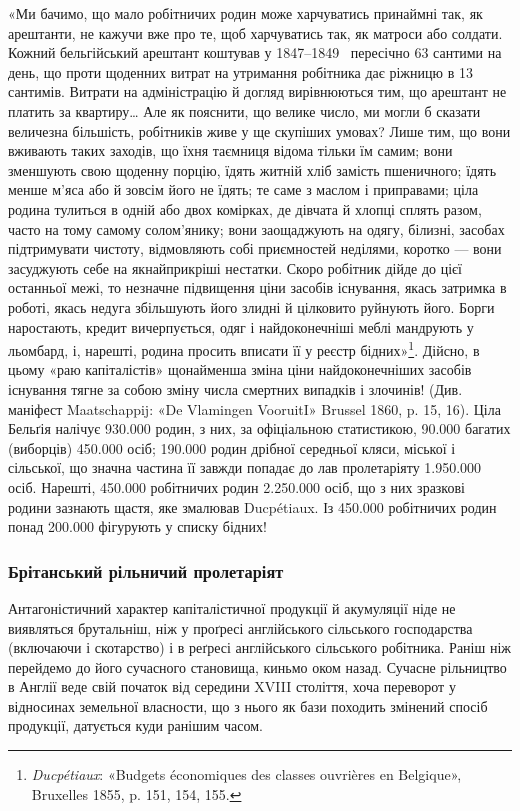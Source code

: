 
\noindent{}«Ми бачимо, що мало робітничих родин може харчуватись
принаймні так, як арештанти, не кажучи вже про те, щоб харчуватись
так, як матроси або солдати. Кожний бельгійський арештант
коштував у 1847--1849~ пересічно 63 сантими на день,
що проти щоденних витрат на утримання робітника дає ріжницю
в 13 сантимів. Витрати на адміністрацію й догляд вирівнюються
тим, що арештант не платить за квартиру\dots{} Але як пояснити, що
велике число, ми могли б сказати величезна більшість, робітників
живе у ще скупіших умовах? Лише тим, що вони вживають
таких заходів, що їхня таємниця відома тільки їм самим; вони
зменшують свою щоденну порцію, їдять житній хліб замість пшеничного;
їдять менше м’яса або й зовсім його не їдять; те саме
з маслом і приправами; ціла родина тулиться в одній або двох
комірках, де дівчата й хлопці сплять разом, часто на тому самому
солом’янику; вони заощаджують на одягу, білизні, засобах підтримувати
чистоту, відмовляють собі приємностей неділями,
коротко — вони засуджують себе на якнайприкріші нестатки.
Скоро робітник дійде до цієї останньої межі, то незначне підвищення
ціни засобів існування, якась затримка в роботі, якась
недуга збільшують його злидні й цілковито руйнують його. Борги
наростають, кредит вичерпується, одяг і найдоконечніші меблі
мандрують у льомбард, і, нарешті, родина просить вписати її
у реєстр бідних»\footnote{
\emph{Ducpétiaux}: «Budgets économiques des classes ouvrières en Belgique»,
Bruxelles 1855, p. 151, 154, 155.
}. Дійсно, в цьому «раю капіталістів» щонайменша
зміна ціни найдоконечніших засобів існування тягне
за собою зміну числа смертних випадків і злочинів! (Див. маніфест
Maatschappij: «De Vlamingen VooruitI» Brussel 1860,
p. 15, 16). Ціла Бельґія налічує \num{930.000} родин, з них, за офіціальною
статистикою, \num{90.000} багатих (виборців) \deq{} \num{450.000} осіб; \num{190.000}
родин дрібної середньої кляси, міської і сільської, що значна
частина її завжди попадає до лав пролетаріяту \deq{} \num{1.950.000} осіб.
Нарешті, \num{450.000} робітничих родин \deq{} \num{2.250.000} осіб, що з них
зразкові родини зазнають щастя, яке змалював Ducpétiaux. Із \num{450.000} робітничих
родин понад \num{200.000} фігурують у списку бідних!

\subsubsection{Брітанський рільничий пролетаріят}

Антагоністичний характер капіталістичної продукції й акумуляції
ніде не виявляться брутальніш, ніж у проґресі англійського
сільського господарства (включаючи і скотарство) і в
реґресі англійського сільського робітника. Раніш ніж перейдемо
до його сучасного становища, киньмо оком назад. Сучасне
рільництво в Англії веде свій початок від середини XVIII століття,
хоча переворот у відносинах земельної власности, що з
нього як бази походить змінений спосіб продукції, датується куди
ранішим часом.
